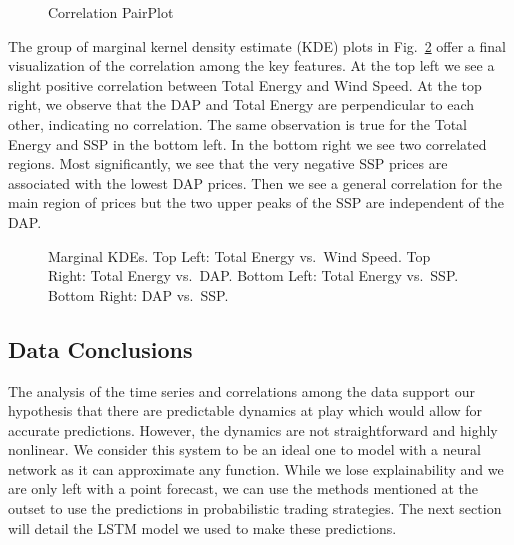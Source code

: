 \documentclass[
  journal,
]{IEEEtran}%
\begin{document}
\begin{figure}


\caption{\label{fig-correlation-plots}Correlation PairPlot}

\end{figure}%

The group of marginal kernel density estimate (KDE) plots in
Fig.~\ref{fig-marginal-kde} offer a final visualization of the
correlation among the key features. At the top left we see a slight
positive correlation between Total Energy and Wind Speed. At the top
right, we observe that the DAP and Total Energy are perpendicular to
each other, indicating no correlation. The same observation is true for
the Total Energy and SSP in the bottom left. In the bottom right we see
two correlated regions. Most significantly, we see that the very
negative SSP prices are associated with the lowest DAP prices. Then we
see a general correlation for the main region of prices but the two
upper peaks of the SSP are independent of the DAP.

\begin{figure}


\caption{\label{fig-marginal-kde}Marginal KDEs. Top Left: Total Energy
vs.~Wind Speed. Top Right: Total Energy vs.~DAP. Bottom Left: Total
Energy vs.~SSP. Bottom Right: DAP vs.~SSP.}

\end{figure}%

\subsection{Data Conclusions}\label{data-conclusions}

The analysis of the time series and correlations among the data support
our hypothesis that there are predictable dynamics at play which would
allow for accurate predictions. However, the dynamics are not
straightforward and highly nonlinear. We consider this system to be an
ideal one to model with a neural network as it can approximate any
function. While we lose explainability and we are only left with a point
forecast, we can use the methods mentioned at the outset to use the
predictions in probabilistic trading strategies. The next section will
detail the LSTM model we used to make these predictions.
\end{document}
